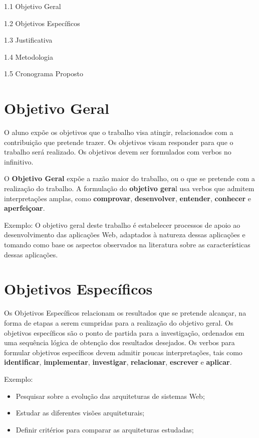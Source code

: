 1.1 Objetivo Geral

1.2 Objetivos Específicos

1.3 Justificativa

1.4 Metodologia

1.5 Cronograma Proposto

\section{Objetivo Geral}

O aluno expõe os objetivos que o trabalho visa atingir, relacionados com a contribuição
que pretende trazer. Os objetivos visam responder para que o trabalho será realizado.
Os objetivos devem ser formulados com verbos no infinitivo.

O \textbf{Objetivo Geral} expõe a razão maior do trabalho, ou o que se pretende com a realização do trabalho. A formulação do \textbf{objetivo gera}l usa verbos que admitem interpretações amplas, como \textbf{comprovar}, \textbf{desenvolver},
\textbf{entender}, \textbf{conhecer} e
\textbf{aperfeiçoar}.

Exemplo: O objetivo geral deste trabalho é estabelecer processos de apoio ao desenvolvimento das aplicações Web, adaptados à natureza dessas aplicações e tomando como base os aspectos observados na literatura sobre as características
dessas aplicações.

\section{Objetivos Específicos}
Os Objetivos Específicos relacionam os resultados que se pretende alcançar, na forma de etapas a serem cumpridas para a realização do objetivo geral. Os objetivos específicos são o ponto de partida para a investigação, ordenados
em uma sequência lógica de obtenção dos resultados desejados.
Os verbos para formular objetivos específicos devem admitir poucas interpretações, tais como \textbf{identificar}, \textbf{implementar}, \textbf{investigar}, \textbf{relacionar}, \textbf{escrever} e \textbf{aplicar}.

Exemplo:
\begin{itemize}
 \item Pesquisar sobre a evolução das arquiteturas de sistemas Web;
 \item Estudar as diferentes visões arquiteturais;
 \item Definir critérios para comparar as arquiteturas estudadas;
\end{itemize}

